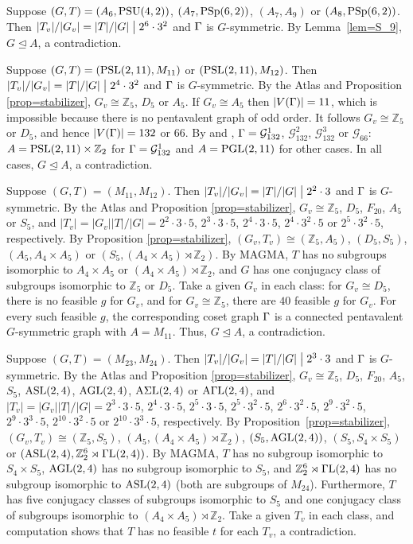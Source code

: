 \documentclass[12pt]{article}
\def\di{\bigm|} \def\lg{\langle} \def\rg{\rangle}
\def\PSL{\hbox{\rm PSL}}\def\PSU{\hbox{\rm PSU}}
\def\PSp{\hbox{\rm PSp}}\def\P\GammaL{\hbox{\rm P\Gamma L}} \def\ASIL{\hbox{\rm A\Sigma L}}
\def\mz{{\mathbb Z}}
\begin{document}
Suppose $(G,T)=(A_6, \PSU(4,2))$, $(A_7, \PSp(6,2))$, $(A_7, A_9)$ or $(A_8, \PSp(6,2))$. Then $|T_v|/|G_v|=|T|/|G|\di 2^6\cdot3^2$ and $\Gamma$ is $G$-symmetric. By Lemma~\ref{lem=S_9}, $G\unlhd A$, a contradiction.

Suppose $(G,T)=(\PSL(2,11),M_{11})$ or $(\PSL(2,11),M_{12})$. Then $|T_v|/|G_v|=|T|/|G|\di 2^4\cdot3^2$
and $\Gamma$ is $G$-symmetric. By the Atlas \cite[p. 7]{Atlas} and Proposition \ref{prop=stabilizer},
$G_v\cong \mz_5$, $D_5$ or $A_5$. If $G_v\cong A_5$ then $|V(\Gamma)|=11$, which is impossible because
there is no pentavalent graph of odd order. It follows $G_v\cong \mz_5$ or $D_5$,
and hence $|V(\Gamma)|=132$ or $66$. By \cite[Theorem 4.1]{Guo12p} and \cite[Theorem 4.2]{hua}, $\Gamma= \mathcal{G}_{132}^1$, $\mathcal{G}_{132}^2$, $\mathcal{G}_{132}^3$ or $\mathcal{G}_{66}$: $A=\PSL(2,11)\times \mz_2$
for $\Gamma= \mathcal{G}_{132}^1$ and $A=\hbox{\rm PGL}(2,11)$ for other cases. In all cases, $G\unlhd A$, a contradiction.

Suppose $(G,T)=(M_{11},M_{12})$. Then $|T_v|/|G_v|=|T|/|G|\di 2^2\cdot3$ and $\Gamma$ is $G$-symmetric.
By the Atlas \cite[p. 18]{Atlas} and Proposition \ref{prop=stabilizer}, $G_v\cong \mz_5$, $D_5$, $F_{20}$, $A_5$ or $S_5$,
and $|T_v|=|G_v||T|/|G|= 2^2\cdot3 \cdot 5$, $2^3\cdot3 \cdot 5$, $2^4\cdot 3\cdot 5$, $2^4\cdot 3^2\cdot 5$ or
$2^5\cdot 3^2\cdot 5$, respectively. By Proposition \ref{prop=stabilizer}, $(G_v,T_v)\cong (\mz_5,A_5)$, $(D_5,S_5)$,
$(A_5,A_4 \times A_5)$ or $(S_5,(A_4\times A_5)\rtimes \mz_2)$. By MAGMA, $T$ has no subgroups isomorphic to
$A_4 \times A_5$ or $(A_4 \times A_5)\rtimes \mz_2$, and $G$ has one conjugacy class of subgroups isomorphic
to $\mz_5$ or $D_5$. Take a given $G_v$ in each class: for $G_v\cong D_5$, there is no feasible $g$ for $G_v$,
and for $G_v\cong \mz_5$, there are $40$ feasible $g$ for $G_v$. For every such feasible $g$, the corresponding
coset graph $\Gamma$ is a connected pentavalent $G$-symmetric graph with $A=M_{11}$. Thus, $G\unlhd A$, a contradiction.

Suppose $(G,T)=(M_{23},M_{24})$. Then $|T_v|/|G_v|=|T|/|G|\di 2^3\cdot3$ and $\Gamma$ is $G$-symmetric.
By the Atlas \cite[p. 71]{Atlas} and Proposition \ref{prop=stabilizer}, $G_v\cong \mz_5$, $D_5$, $F_{20}$,
$A_5$, $S_5$, $\rm ASL(2,4)$, $\rm AGL(2,4)$, $\rm A \Sigma L(2,4)$ or $\rm A\Gamma L(2,4)$, and
$|T_v|=|G_v||T|/|G|= 2^3\cdot3 \cdot 5$, $2^4\cdot3 \cdot 5$, $2^5\cdot 3\cdot 5$, $2^5\cdot 3^2\cdot 5$,
$2^6\cdot 3^2\cdot 5$, $2^9\cdot 3^2\cdot 5$,  $2^9\cdot 3^3\cdot 5$, $2^{10}\cdot 3^2\cdot 5$ or
$2^{10}\cdot 3^3\cdot 5$, respectively. By Proposition~\ref{prop=stabilizer}, $(G_v,T_v)\cong (\mz_5,S_5)$,
$(A_5,(A_4 \times A_5)\rtimes \mz_2)$, $(S_5,\rm AGL(2,4))$, $(S_5,S_4 \times S_5)$ or
$(\hbox{\rm ASL}(2,4),\mathbb{Z}^6_2\rtimes  {\rm \Gamma L}(2,4))$. By MAGMA, $T$ has no subgroup isomorphic to
$S_4 \times S_5$, $\rm AGL(2,4)$ has no subgroup isomorphic to $S_5$, and
$\mathbb{Z}^6_2\rtimes  {\rm \Gamma L}(2,4)$ has no subgroup isomorphic to $\hbox{\rm ASL}(2,4)$ (both are subgroups of $M_{24}$).
Furthermore, $T$ has five conjugacy classes of subgroups isomorphic to $S_5$ and one conjugacy class of subgroups isomorphic to $(A_4\times A_5)\rtimes \mz_2$. Take a given  $T_v$ in each class, and computation shows that $T$ has no feasible $t$ for each $T_v$, a contradiction.
\end{document}
